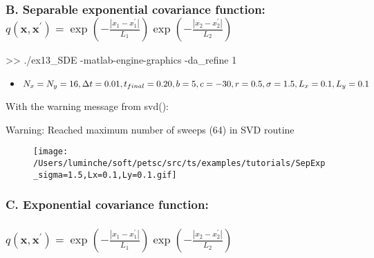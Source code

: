 \documentclass[
]{article}
\newenvironment{Shaded}{}{}
\newcommand{\FloatTok}[1]{\textcolor[rgb]{0.25,0.63,0.44}{#1}}
\newcommand{\NormalTok}[1]{#1}
\begin{document}
\hypertarget{header-n414}{%
\subsubsection{\texorpdfstring{B. Separable exponential covariance
function:
\(q(\mathbf{x},\mathbf{x}^{\prime})=\exp\left(-\frac{|x_1-x^{\prime}_1|}{L_1}\right) \exp\left(-\frac{|x_2-x^{\prime}_2|}{L_2}\right)\)}{B. Separable exponential covariance function: q(\textbackslash mathbf\{x\},\textbackslash mathbf\{x\}\^{}\{\textbackslash prime\})=\textbackslash exp\textbackslash left(-\textbackslash frac\{\textbar x\_1-x\^{}\{\textbackslash prime\}\_1\textbar\}\{L\_1\}\textbackslash right) \textbackslash exp\textbackslash left(-\textbackslash frac\{\textbar x\_2-x\^{}\{\textbackslash prime\}\_2\textbar\}\{L\_2\}\textbackslash right)}}\label{header-n414}}

\begin{Shaded}
\begin{Highlighting}[]
\NormalTok{>> ./ex13_SDE -matlab-engine-graphics -da_refine }\FloatTok{1}
\end{Highlighting}
\end{Shaded}

\begin{itemize}
\item
  \(N_x=N_y=16, \Delta t=0.01, t_{final}=0.20,\\b=5,c=-30,r=0.5,\\\sigma=1.5,L_{x}=0.1,L_{y}=0.1\)
\end{itemize}

With the warning message from svd():

Warning: Reached maximum number of sweeps (64) in SVD routine

\begin{figure}
\centering
\texttt{[image: /Users/luminche/soft/petsc/src/ts/examples/tutorials/SepExp\_sigma=1.5,Lx=0.1,Ly=0.1.gif]}
\caption{}
\end{figure}

\hypertarget{header-n429}{%
\subsubsection{C. Exponential covariance function:}\label{header-n429}}

\hypertarget{header-n439}{%
\subsubsection{\texorpdfstring{\(q(\mathbf{x},\mathbf{x}^{\prime})=\exp\left(-\frac{|x_1-x^{\prime}_1|}{L_1}\right) \exp\left(-\frac{|x_2-x^{\prime}_2|}{L_2}\right)\)}{q(\textbackslash mathbf\{x\},\textbackslash mathbf\{x\}\^{}\{\textbackslash prime\})=\textbackslash exp\textbackslash left(-\textbackslash frac\{\textbar x\_1-x\^{}\{\textbackslash prime\}\_1\textbar\}\{L\_1\}\textbackslash right) \textbackslash exp\textbackslash left(-\textbackslash frac\{\textbar x\_2-x\^{}\{\textbackslash prime\}\_2\textbar\}\{L\_2\}\textbackslash right)}}\label{header-n439}}
\end{document}
